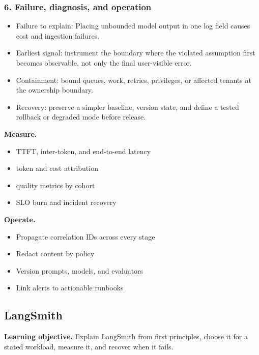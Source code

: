 \subsubsection*{6. Failure, diagnosis, and operation}
\begin{itemize}
\item Failure to explain: Placing unbounded model output in one log field causes cost and ingestion failures.
\item Earliest signal: instrument the boundary where the violated assumption first becomes observable, not only the final user-visible error.
\item Containment: bound queues, work, retries, privileges, or affected tenants at the ownership boundary.
\item Recovery: preserve a simpler baseline, version state, and define a tested rollback or degraded mode before release.
\end{itemize}
\textbf{Measure.}\begin{itemize}
\item TTFT, inter-token, and end-to-end latency
\item token and cost attribution
\item quality metrics by cohort
\item SLO burn and incident recovery
\end{itemize}
\textbf{Operate.}\begin{itemize}
\item Propagate correlation IDs across every stage
\item Redact content by policy
\item Version prompts, models, and evaluators
\item Link alerts to actionable runbooks
\end{itemize}
\subsection{LangSmith}
\textbf{Learning objective.} Explain LangSmith from first principles, choose it for a stated workload, measure it, and recover when it fails.
